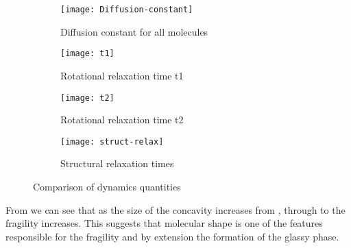 \begin{figure}
    \begin{subfigure}{0.5\linewidth}
        \texttt{[image: Diffusion-constant]}
        \caption{Diffusion constant for all molecules}
        \label{fig:diffusion constant}
    \end{subfigure}
    \begin{subfigure}{0.5\linewidth}
        \texttt{[image: t1]}
        \caption{Rotational relaxation time t1}
        \label{fig:tau1}
    \end{subfigure}
    \begin{subfigure}{0.5\textwidth}
        \texttt{[image: t2]}
        \caption{Rotational relaxation time t2}
        \label{fig:tau2}
    \end{subfigure}
    \begin{subfigure}{0.5\textwidth}
        \texttt{[image: struct-relax]}
        \caption{Structural relaxation times}
        \label{fig:struct relax}
    \end{subfigure}
    \caption{Comparison of dynamics quantities}
    \label{fig:dynamic comparison}
\end{figure}

From  we can see that as the size of the concavity increases from \sone, through \scon to \tri the fragility increases. This suggests that molecular shape is one of the features responsible for the fragility and by extension the formation of the glassy phase.
